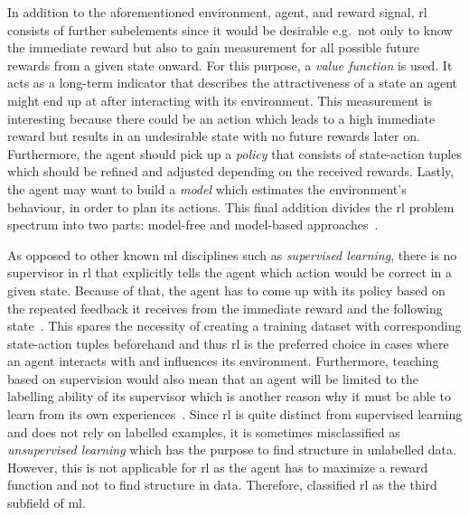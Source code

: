 \documentclass[draft,final]{vutinfth} %
\newcommand{\p}[1]{see p. #1}
\begin{document}
    In addition to the aforementioned environment, agent, and reward signal, \gls{rl} consists of further subelements since it would be desirable e.g.\ not only to know the immediate reward but also to gain measurement for all possible future rewards from a given state onward.
    For this purpose, a \textit{value function} is used.
    It acts as a long-term indicator that describes the attractiveness of a state an agent might end up at after interacting with its environment.
    This measurement is interesting because there could be an action which leads to a high immediate reward but results in an undesirable state with no future rewards later on.
    Furthermore, the agent should pick up a \textit{policy} that consists of state-action tuples which should be refined and adjusted depending on the received rewards.
    Lastly, the agent may want to build a \textit{model} which estimates the environment's behaviour, in order to plan its actions.
    This final addition divides the \gls{rl} problem spectrum into two parts: model-free and model-based approaches~\citep[6f]{sutton_reinforcement_2018}.


    As opposed to other known \gls{ml} disciplines such as \textit{supervised learning}, there is no supervisor in \gls{rl} that explicitly tells the agent which action would be correct in a given state.
    Because of that, the agent has to come up with its policy based on the repeated feedback it receives from the immediate reward and the following state~\citep{kaelbling_reinforcement_1996}.
    This spares the necessity of creating a training dataset with corresponding state-action tuples beforehand and thus \gls{rl} is the preferred choice in cases where an agent interacts with and influences its environment.
    Furthermore, teaching based on supervision would also mean that an agent will be limited to the labelling ability of its supervisor which is another reason why it must be able to learn from its own experiences~.
    Since \gls{rl} is quite distinct from supervised learning and does not rely on labelled examples, it is sometimes misclassified as \textit{unsupervised learning} which has the purpose to find structure in unlabelled data.
    However, this is not applicable for \gls{rl} as the agent has to maximize a reward function and not to find structure in data.
    Therefore, \citet[\p{2}]{sutton_reinforcement_2018} classified \gls{rl} as the third subfield of \gls{ml}.
\end{document}
